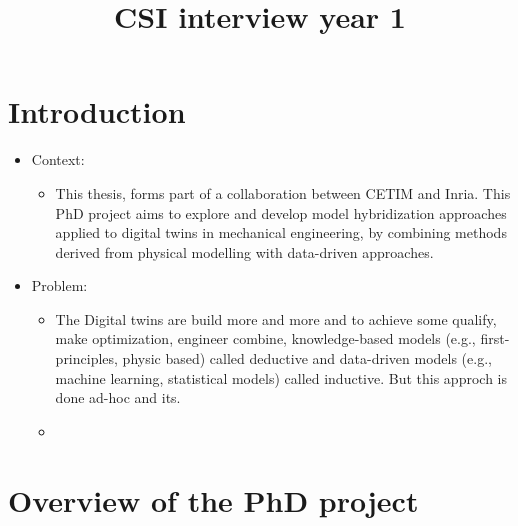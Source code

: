 \documentclass[
]{article}
\title{CSI interview year 1}
\author{}
\date{}
\providecommand{\tightlist}{%
  \setlength{\itemsep}{0pt}\setlength{\parskip}{0pt}}
\begin{document}
\maketitle

\section{Introduction}\label{introduction}

\begin{itemize}
\tightlist
\item
  Context:

  \begin{itemize}
  \tightlist
  \item
    This thesis, forms part of a collaboration between CETIM and Inria.
    This PhD project aims to explore and develop model hybridization
    approaches applied to digital twins in mechanical engineering, by
    combining methods derived from physical modelling with data-driven
    approaches.
  \end{itemize}
\item
  Problem:

  \begin{itemize}
  \tightlist
  \item
    The Digital twins are build more and more and to achieve some
    qualify, make optimization, engineer combine, knowledge-based models
    (e.g., first-principles, physic based) called deductive and
    data-driven models (e.g., machine learning, statistical models)
    called inductive. But this approch is done ad-hoc and
    it\textquotesingle s.
  \item
  \end{itemize}
\end{itemize}

\section{Overview of the PhD project}\label{overview-of-the-phd-project}
\end{document}
